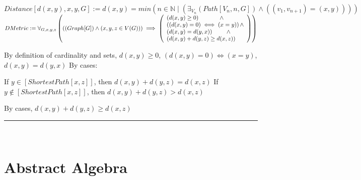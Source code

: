 \documentclass{book}
\newcommand{\abr}{:=}
\newcommand{\pr}[1]{\left(#1\right)}
\newcommand{\st}{\mathbin{|}}
\begin{document}
$Distance[d(x, y), x, y, G] \abr d(x, y) = min\pr{{n \in \mathbb{N} \st \pr{\exists_{V_n}(Path[V_n, n, G]) \land \pr{(v_1, v_{n + 1}) = (x, y)}}}}$ \\
$DMetric \abr \forall_{G, x, y, z}\pr{\pr{(Graph[G]) \land \pr{x, y, z \in V(G)}} \implies 
\left(\begin{array}{ll}
  \pr{d(x, y) \geq 0} \hfill \land \hfill \\
  \pr{\pr{d(x, y) = 0} \iff (x = y)} \hfill \land \hfill \\
  \pr{d(x, y) = d(y, x)} \hfill \land \hfill \\
  \pr{d(x, y) + d(y, z) \geq d(x, z)} \\
\end{array}\right)}$ \\
\begin{enumerate}
  \lit By definition of cardinality and sets, $d(x, y) \geq 0$, $\pr{d(x, y) = 0} \iff (x = y)$, $d(x, y) = d(y, x)$
  \lit By cases:
  \begin{enumerate}
    \lit If $y \in [ShortestPath[x, z]]$, then $d(x, y) + d(y, z) = d(x, z)$
    \lit If $y \notin [ShortestPath[x, z]]$, then $d(x, y) + d(y, z) > d(x, z)$
  \end{enumerate}
  \lit By cases, $d(x, y) + d(y, z) \geq d(x, z)$
\end{enumerate} \vspace{.75mm} \hrule \vspace{.75mm} \ \\ 









\chapter{Abstract Algebra}
\end{document}
